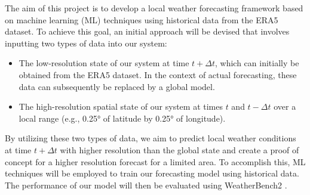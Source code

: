 The aim of this project is to develop a local weather forecasting framework based on machine learning (ML) techniques using historical data from the ERA5 dataset. To achieve this goal, an initial approach will be devised that involves inputting two types of data into our system:\\

\begin{itemize}
    \item The low-resolution state of our system at time \( t + \Delta t \), which can initially be obtained from the ERA5 dataset. In the context of actual forecasting, these data can subsequently be replaced by a global model.
    \item The high-resolution spatial state of our system at times \( t \) and \( t - \Delta t \) over a local range (e.g., 0.25° of latitude by 0.25° of longitude).
\end{itemize}

\vspace{2em}

By utilizing these two types of data, we aim to predict local weather conditions at time \( t + \Delta t \) with higher resolution than the global state and create a proof of concept for a higher resolution forecast for a limited area. To accomplish this, ML techniques will be employed to train our forecasting model using historical data. The performance of our model will then be evaluated using WeatherBench2 \cite{Weatherbench}.





\newpage